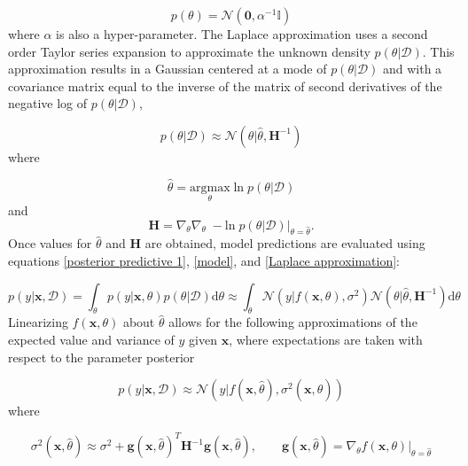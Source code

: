 \documentclass[11pt]{article} %
\begin{document}
\begin{equation}
p(\theta) = \mathcal{N}(\mathbf{0}, \alpha^{-1} \mathbb{I})
\end{equation}
where $\alpha$ is also a hyper-parameter. The Laplace approximation uses a second order Taylor series expansion to approximate the unknown density $p(\theta | \mathcal{D})$. This approximation results in a Gaussian centered at a mode of $p(\theta | \mathcal{D})$ and with a covariance matrix equal to the inverse of the matrix of second derivatives of the negative log of $p(\theta | \mathcal{D})$, 

\begin{equation}
p(\theta | \mathcal{D}) \approx \mathcal{N}(\theta | \hat{\theta}, \mathbf{H}^{-1})
\label{Laplace approximation}
\end{equation}
where

\begin{equation}
\hat{\theta} = \underset{\theta}{\text{argmax}} \; \mathrm{ln} \; p(\theta | \mathcal{D})
\end{equation}
and 
\begin{equation}
\mathbf{H} = \nabla_{\theta} \nabla_{\theta} \; -\mathrm{ln} \; \left. p(\theta | \mathcal{D}) \right|_{\theta = \hat{\theta}}.
\label{Hessian 1}
\end{equation}
Once values for $\hat{\theta}$ and $\mathbf{H}$ are obtained, model predictions are evaluated using equations \ref{posterior predictive 1}, \ref{model}, and \ref{Laplace approximation}:

\begin{equation}
p(y | \mathbf{x}, \mathcal{D}) 
= \int_{\theta} p(y | \mathbf{x}, \theta) p(\theta | \mathcal{D}) \mathrm{d} \theta 
\approx \int_{\theta} \mathcal{N} (y | f(\mathbf{x}, \theta), \sigma^2)  \mathcal{N}(\theta | \hat{\theta}, \mathbf{H}^{-1}) \mathrm{d} \theta 
\label{posterior predictive 2}
\end{equation}
Linearizing $f(\mathbf{x}, \theta)$ about $\hat{\theta}$ allows for the following approximations of the expected value and variance of $y$ given $\mathbf{x}$, where expectations are taken with respect to the parameter posterior

\begin{equation}
p(y | \mathbf{x}, \mathcal{D}) \approx \mathcal{N}(y | f(\mathbf{x}, \hat{\theta}), \sigma^2(\mathbf{x}, \hat{\theta}))
\end{equation}
where
 
\begin{equation}
\sigma^2(\mathbf{x}, \hat{\theta}) \approx \sigma^2 + \mathbf{g}(\mathbf{x}, \hat{\theta})^T \mathbf{H}^{-1} \mathbf{g}(\mathbf{x}, \hat{\theta}),
\qquad
\mathbf{g}(\mathbf{x}, \hat{\theta}) = \nabla_{\theta} \left. f(\mathbf{x}, \theta) \right|_{\theta = \hat{\theta}}
\label{variance}
\end{equation}
\end{document}
